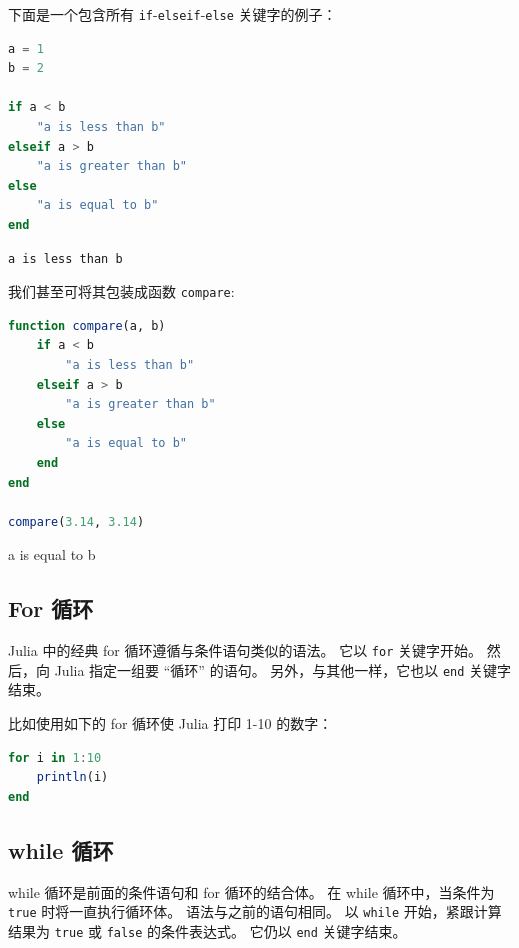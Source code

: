 \documentclass[
  notoc %
]{tufte-book}
\newcommand{\passthrough}[1]{#1}
\begin{document}
下面是一个包含所有
\passthrough{\lstinline!if!}-\passthrough{\lstinline!elseif!}-\passthrough{\lstinline!else!}
关键字的例子：

\begin{lstlisting}[language=Julia]
a = 1
b = 2

if a < b
    "a is less than b"
elseif a > b
    "a is greater than b"
else
    "a is equal to b"
end
\end{lstlisting}

\begin{lstlisting}[language=Output]
a is less than b
\end{lstlisting}

我们甚至可将其包装成函数 \passthrough{\lstinline!compare!}:

\begin{lstlisting}[language=Julia]
function compare(a, b)
    if a < b
        "a is less than b"
    elseif a > b
        "a is greater than b"
    else
        "a is equal to b"
    end
end

compare(3.14, 3.14)
\end{lstlisting}

a is equal to b

\hypertarget{sec:for}{%
\subsection{For 循环}\label{sec:for}}

Julia 中的经典 for 循环遵循与条件语句类似的语法。 它以
\passthrough{\lstinline!for!} 关键字开始。 然后，向 Julia 指定一组要
``循环'' 的语句。 另外，与其他一样，它也以 \passthrough{\lstinline!end!}
关键字结束。

比如使用如下的 for 循环使 Julia 打印 1-10 的数字：

\begin{lstlisting}[language=Julia]
for i in 1:10
    println(i)
end
\end{lstlisting}

\hypertarget{sec:while}{%
\subsection{while 循环}\label{sec:while}}

while 循环是前面的条件语句和 for 循环的结合体。 在 while
循环中，当条件为 \passthrough{\lstinline!true!} 时将一直执行循环体。
语法与之前的语句相同。 以 \passthrough{\lstinline!while!}
开始，紧跟计算结果为 \passthrough{\lstinline!true!} 或
\passthrough{\lstinline!false!} 的条件表达式。 它仍以
\passthrough{\lstinline!end!} 关键字结束。
\end{document}
